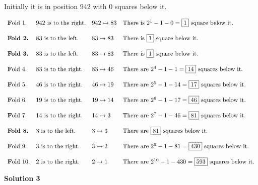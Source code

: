 \begin{enumerate}
 Initially it is in position $942$ with $0$ squares below it. 

 
 \[\begin{array}{llll} \text{\textbf Fold 1.} & 942 \text{ is to the right.} & 942 \mapsto 83 & \text{There is } 2^1 - 1 - 0=\boxed{1} \text{ square below it.} \\  &&& \\ \textbf{Fold 2.} & 83 \text{ is to the left.} & 83 \mapsto 83 & \text{There is } \boxed{1} \text{ square below it.} \\ &&& \\ \textbf{Fold 3.} & 83 \text{ is to the left.} & 83 \mapsto 83 & \text{There is } \boxed{1} \text{ square below it.} \\ &&& \\ \text{\textbf Fold 4.} & 83 \text{ is to the right.} & 83 \mapsto 46 & \text{There are } 2^4 - 1 - 1 = \boxed{14} \text{ squares below it.}\\  &&& \\ \text{\textbf Fold 5.} & 46 \text{ is to the right.} & 46 \mapsto 19 & \text{There are } 2^5 - 1 - 14 = \boxed{17} \text{ squares below it.}\\  &&& \\ \text{\textbf Fold 6.} & 19 \text{ is to the right.} & 19 \mapsto 14 & \text{There are } 2^6 - 1 - 17 = \boxed{46} \text{ squares below it.}\\  &&& \\ \text{\textbf Fold 7.} & 14 \text{ is to the right.} & 14 \mapsto 3 & \text{There are } 2^7 - 1 - 46 = \boxed{81} \text{ squares below it.}\\  &&& \\ \textbf{Fold 8.} & 3 \text{ is to the left.} & 3 \mapsto 3 & \text{There are } \boxed{81} \text{ squares below it.} \\ &&& \\ \text{\textbf Fold 9.} & 3 \text{ is to the right.} & 3 \mapsto 2 & \text{There are } 2^9 - 1 - 81  = \boxed{430} \text{ squares below it.}\\  &&& \\ \text{\textbf Fold 10.} & 2 \text{ is to the right.} & 2 \mapsto 1 & \text{There are } 2^{10} - 1 - 430 = \boxed{593} \text{ squares below it.}\\  \end{array}\]




\textbf{Solution 3}


\end{enumerate}

